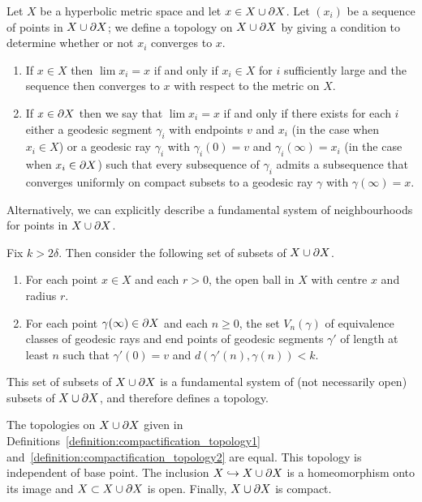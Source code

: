 \begin{definition}
  \label{definition:compactification_topology1}
  Let $X$ be a hyperbolic metric space and let $x \in X \cup \partial X$.
  Let $(x_i)$ be a sequence of points in $X \cup \partial X$; we define a topology on $X \cup \partial X$ by giving a condition to determine whether or not $x_i$ converges to $x$.
  \begin{enumerate}
    \item If $x \in X$ then $\lim x_i = x$ if and only if $x_i \in X$ for $i$ sufficiently large and the sequence then converges to $x$ with respect to the metric on $X$.
    \item If $x \in \partial X$ then we say that $\lim x_i = x$ if and only if there exists for each $i$ either a geodesic segment $\gamma_i$ with endpoints $v$ and $x_i$ (in the case when $x_i \in X$) or a geodesic ray $\gamma_i$ with $\gamma_i(0) = v$ and $\gamma_i(\infty) = x_i$ (in the case when $x_i \in \partial X$) such that every subsequence of $\gamma_i$ admits a subsequence that converges uniformly on compact subsets to a geodesic ray $\gamma$ with $\gamma(\infty) = x$.
  \end{enumerate}
\end{definition}

Alternatively, we can explicitly describe a fundamental system of neighbourhoods for points in $X \cup \partial X$.

\begin{definition}
  \label{definition:compactification_topology2}
  Fix $k > 2\delta$.
  Then consider the following set of subsets of $X \cup \partial X$.
  \begin{enumerate}
    \item For each point $x \in X$ and each $r > 0$, the open ball in $X$ with centre $x$ and radius $r$. 
    \item For each point $\gamma(\infty) \in \partial X$ and each $n \geq 0$, the set $V_n(\gamma)$ of equivalence classes of geodesic rays and end points of geodesic segments $\gamma'$ of length at least $n$ such that $\gamma'(0) = v$ and $d(\gamma'(n), \gamma(n)) < k$.
  \end{enumerate}
  This set of subsets of $X \cup \partial X$ is a fundamental system of (not necessarily open) subsets of $X \cup \partial X$, and therefore defines a topology.
\end{definition}

\begin{proposition}\label{proposition:equivalent_boundary_topologies}\cite[III.H.3.6]{bridsonhaefliger99}
  The topologies on $X \cup \partial X$ given in Definitions~\ref{definition:compactification_topology1} and~\ref{definition:compactification_topology2} are equal.
  This topology is independent of base point.
  The inclusion $X \hookrightarrow X \cup \partial X$ is a homeomorphism onto its image and $X \subset X \cup \partial X$ is open.
  Finally, $X \cup \partial X$ is compact.
\end{proposition}

